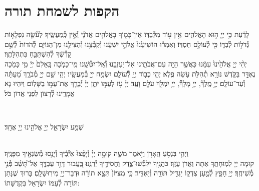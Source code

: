 \documentclass[twoside, openany, parskip=half, 11pt]{book}
\begin{document}
\chapter[הקפות לשמחת תורה]{ הקפות לשמחת תורה }


לָדַ֔עַת כִּ֥י יְיָ֖ ה֣וּא הָאֱלֹהִ֑ים אֵ֥ין ע֖וֹד מִלְּ֯בַדּֽוֹ׃ \hfill \break
אֵין־כָּמ֖וֹךָ בָאֱלֹהִ֥ים אֲדֹנָ֗י וְ֯אֵ֣ין כְּֽ֯מַעֲשֶֽׂיךָ׃ \hfill \break
לְעֹ֘שֵׂ֤ה נִפְלָא֣וֹת גְּ֯דֹל֣וֹת לְ֯בַדּ֑וֹ כִּ֖י לְ֯עוֹלָ֣ם חַסְדּֽוֹ׃ \hfill \break
וְאִמְר֕וּ הוֹשִׁיעֵ֙נוּ֙ אֱלֹהֵ֣י יִשְׁעֵ֔נוּ וְ֯קַבְּ֯צֵ֥נוּ וְ֯הַצִּילֵ֖נוּ מִן־הַגּוֹיִ֑ם לְ֯הֹדוֹת֙ לְ֯שֵׁ֣ם קָדְ֯שֶׁ֔ךָ לְ֯הִשְׁתַּבֵּ֖חַ בִּתְהִלָּתֶֽךָ׃\\
יְהִ֨י יְיָ֤ אֱלֹהֵ֙ינוּ֙ עִמָּ֔נוּ כַּאֲשֶׁ֥ר הָיָ֖ה עִם־אֲבֹתֵ֑ינוּ אַל־יַעַזְבֵ֖נוּ וְ֯אַֽל־יִטְּ֯שֵֽׁנוּ׃ \hfill \break
מִֽי־כָמֹ֤כָה בָּֽאֵלִם֙ יְיָ֔ מִ֥י כָּמֹ֖כָה נֶאְדָּ֣ר בַּקֹּ֑דֶשׁ נוֹרָ֥א תְ֯הִלֹּ֖ת עֹ֥שֵׂה פֶֽלֶא׃ \hfill \break
יְהִ֤י כְב֣וֹד יְיָ֣ לְ֯עוֹלָ֑ם יִשְׂמַ֖ח יְיָ֣ בְּ֯מַעֲשָֽׂיו׃ \hfill \break
יְהִ֤י שֵׁ֣ם יְיָ֣ מְ֯בֹרָ֑ךְ מֵ֝עַתָּ֗ה וְ֯עַד־עוֹלָֽם׃ \hfill \break
יְיָ֣ מֶֽלֶךְ֘, יְיָ֣ מָלָךְ֯֘, יְיָ֥ יִמְלֹ֖ךְ עֹלָ֥ם וָעֶֽד׃ \hfill \break
יְיָ֗ עֹ֖ז לְעַמּ֣וֹ יִתֵּ֑ן יְיָ֓ יְ֯בָרֵ֖ךְ אֶת־עַמּ֣וֹ בַשָּׁלֽוֹם׃ \hfill \break
וְיִהְיוּ נָא אֲמָרֵֽינוּ לְ֯רָצוֹן לִפְנֵי אֲדוֹן כֹּל׃ \hfill \break

\vspace{-1.3\baselineskip}

\\
\begin{large}
שְׁמַ֖ע יִשְׂרָאֵ֑ל יְיָ֥ אֱלֹהֵ֖ינוּ יְיָ֥ אֶחָֽד׃
\end{large}

\\
וַיְהִ֛י בִּנְסֹ֥עַ הָֽאָרֹ֖ן וַיֹּ֣אמֶר מֹשֶׁ֑ה קוּמָ֣ה יְיָ֗ וְ֯יָפֻ֨צוּ֙ אֹֽיְ֯בֶ֔יךָ וְ֯יָנֻ֥סוּ מְ֯שַׂנְאֶ֖יךָ מִפָּנֶֽיךָ׃\\
קוּמָה יְיָ לִמְוּחָתֶֽךָ אַתָה וַאֲרֹן עֻזֶּֽךָ׃ \hfill \break
כֹּהֲנֶ֥יךָ יִלְבְּ֯שׁוּ־צֶ֑דֶק וַחֲסִידֶ֥יךָ יְ֯רַנֵּֽנוּ׃ \hfill \break
בַּֽ֭עֲבוּר דָּוִ֣ד עַבְדֶּ֑ךָ אַל־תָּ֝שֵׁ֗ב פְּ֯נֵ֣י מְ֯שִׁיחֶֽךָ׃ \hfill \break
יְיָ֥ חָפֵ֖ץ לְ֯מַ֣עַן צִדְק֑וֹ יַגְדִּ֥יל תּוֹרָ֖ה וְ֯יַאְדִּֽיר׃ \hfill \break
כִּ֤י מִצִּיּוֹן֙ תֵּצֵ֣א תוֹרָ֔ה וּדְבַר־יְיָ֖ מִירֽוּשָׁלָֽםִ׃ \hfill \break
בָּרוּךְ שֶׁנָּתַן תּוֹרָה לְ֯עַמּוֹ יִשְׂרָאֵל בִּקְדֻשָּׁתוֹ: \hfill \break
\end{document}
